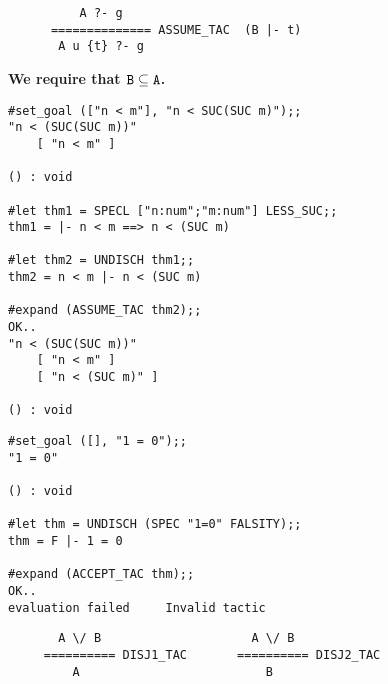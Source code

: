 
\vskip7mm
{\Large\begin{verbatim}
          A ?- g
      ============== ASSUME_TAC  (B |- t)
       A u {t} ?- g
\end{verbatim}}
\bpindent\LARGE\bf
We require that ${\tt B} \subseteq {\tt A}$.
\epindent

\vskip4mm
\begin{session}\begin{verbatim}
#set_goal (["n < m"], "n < SUC(SUC m)");;
"n < (SUC(SUC m))"
    [ "n < m" ]

() : void

#let thm1 = SPECL ["n:num";"m:num"] LESS_SUC;;
thm1 = |- n < m ==> n < (SUC m)

#let thm2 = UNDISCH thm1;;
thm2 = n < m |- n < (SUC m)

#expand (ASSUME_TAC thm2);;
OK..
"n < (SUC(SUC m))"
    [ "n < m" ]
    [ "n < (SUC m)" ]

() : void
\end{verbatim}\end{session}






\begin{session}\begin{verbatim}
#set_goal ([], "1 = 0");;
"1 = 0"

() : void

#let thm = UNDISCH (SPEC "1=0" FALSITY);;
thm = F |- 1 = 0

#expand (ACCEPT_TAC thm);;
OK..
evaluation failed     Invalid tactic
\end{verbatim}\end{session}



\vskip7mm
{\Large\begin{verbatim}
       A \/ B                     A \/ B
     ========== DISJ1_TAC       ========== DISJ2_TAC
         A                          B
\end{verbatim}}

